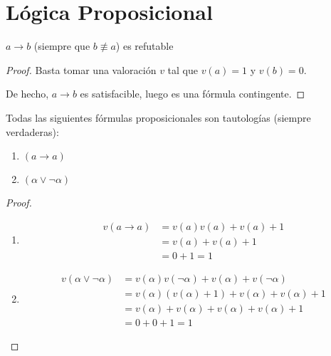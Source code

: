 \section{Lógica Proposicional}

\begin{ejemplo}
    $a\to b$ (siempre que $b\not\equiv a$) es refutable
\end{ejemplo}
\begin{proof}
    Basta tomar una valoración $v$ tal que $v(a)=1$ y $v(b)=0$.

    De hecho, $a\to b$ es satisfacible, luego es una fórmula contingente.
\end{proof}

\begin{ejemplo}
    Todas las siguientes fórmulas proposicionales son tautologías (siempre verdaderas):
    \begin{enumerate}
        \item $(a\rightarrow a)$
        \item $(\alpha\lor \lnot \alpha)$
    \end{enumerate}
\end{ejemplo}
\begin{proof}
    \ 
    \begin{enumerate}
        \item 
            \begin{align*}
                v(a\rightarrow a) &= v(a)v(a)+v(a)+1 \\
                         &= v(a) + v(a) + 1 \\
                         &= 0 + 1 = 1
            \end{align*}
        \item 
            \begin{align*}
                v(\alpha\lor \lnot \alpha) &= v(\alpha)v(\lnot \alpha) + v(\alpha) + v(\lnot \alpha)\\
                                          &= v(\alpha)(v(\alpha)+1) + v(\alpha) + v(\alpha) + 1 \\
                                          &= v(\alpha) + v(\alpha) + v(\alpha) + v(\alpha) + 1\\
                                          &= 0 + 0 + 1 = 1
            \end{align*}
    \end{enumerate}
\end{proof}

